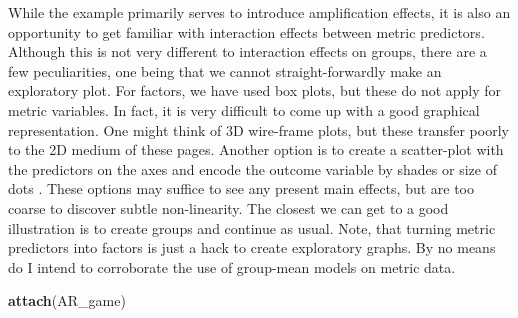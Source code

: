 \documentclass[]{svmono}
\newenvironment{Shaded}{\begin{snugshade}}{\end{snugshade}}
\newcommand{\KeywordTok}[1]{\textcolor[rgb]{0.13,0.29,0.53}{\textbf{#1}}}
\newcommand{\DataTypeTok}[1]{\textcolor[rgb]{0.13,0.29,0.53}{#1}}
\newcommand{\DecValTok}[1]{\textcolor[rgb]{0.00,0.00,0.81}{#1}}
\newcommand{\FloatTok}[1]{\textcolor[rgb]{0.00,0.00,0.81}{#1}}
\newcommand{\StringTok}[1]{\textcolor[rgb]{0.31,0.60,0.02}{#1}}
\newcommand{\OperatorTok}[1]{\textcolor[rgb]{0.81,0.36,0.00}{\textbf{#1}}}
\newcommand{\NormalTok}[1]{#1}
\begin{document}
While the example primarily serves to introduce amplification effects,
it is also an opportunity to get familiar with interaction effects
between metric predictors. Although this is not very different to
interaction effects on groups, there are a few peculiarities, one being
that we cannot straight-forwardly make an exploratory plot. For factors,
we have used box plots, but these do not apply for metric variables. In
fact, it is very difficult to come up with a good graphical
representation. One might think of 3D wire-frame plots, but these
transfer poorly to the 2D medium of these pages. Another option is to
create a scatter-plot with the predictors on the axes and encode the
outcome variable by shades or size of dots . These options may suffice
to see any present main effects, but are too coarse to discover subtle
non-linearity. The closest we can get to a good illustration is to
create groups and continue as usual. Note, that turning metric
predictors into factors is just a hack to create exploratory graphs. By
no means do I intend to corroborate the use of group-mean models on
metric data.

\begin{Shaded}
\begin{Highlighting}[]
\KeywordTok{attach}\NormalTok{(AR_game)}
\end{Highlighting}
\end{Shaded}

\begin{Shaded}
\end{Shaded}
\end{document}

